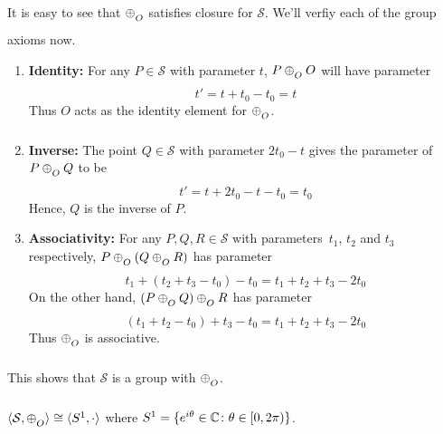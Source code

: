It is easy to see that $\conop$ satisfies closure for $\mathcal{S}$. We'll verfiy each of 
the group axioms now.

\begin{enumerate}
    \item{\textbf{Identity:}} For any $P \in \mathcal{S}$ with parameter $t$,
        $P \conop O$ will have parameter
        \[ t' = t + t_0 - t_0 = t \]
        Thus $O$ acts as the identity element for $\conop$.

    \item{\textbf{Inverse:}} The point $Q\in\mathcal{S}$ with parameter
        $2t_0 - t$ gives the parameter of $P \conop Q$ to be
        \[ t' = t + 2t_0 - t - t_0 = t_0 \]
        Hence, $Q$ is the inverse of $P$.

    \item{\textbf{Associativity:}} For any $P,Q,R \in \mathcal{S}$ with parameters\
        $t_1$, $t_2$ and $t_3$ respectively, $P\conop(Q \conop R)$
        has parameter
        \[
            t_1 + (t_2 + t_3 - t_0) - t_0 =
            t_1 + t_2 + t_3 - 2t_0
        \]
        On the other hand, $(P \conop Q)\conop R$ has parameter
        \[
            (t_1 + t_2 - t_0) + t_3 - t_0 =
            t_1 + t_2 + t_3 - 2t_0
        \]
        Thus $\conop$ is associative.
\end{enumerate}

\noindent
This shows that $\mathcal{S}$ is a group with $\conop$.

\begin{theorem}
    $\langle \mathcal{S},\conop \rangle \cong \langle S^1,\cdot \rangle$ where
    $S^1=\{e^{i\theta}\in\mathbb{C}\colon \theta \in [0,2\pi)\}$.
\end{theorem}

